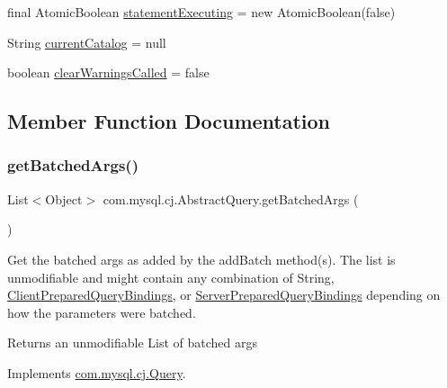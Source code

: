 \begin{DoxyCompactItemize}
\item 
final Atomic\+Boolean \mbox{\hyperlink{classcom_1_1mysql_1_1cj_1_1_abstract_query_a7bc25dcd0d74d8489a3e689fc2277379}{statement\+Executing}} = new Atomic\+Boolean(false)
\item 
String \mbox{\hyperlink{classcom_1_1mysql_1_1cj_1_1_abstract_query_a1b25ce6bc0b1b35dca039d246b51da60}{current\+Catalog}} = null
\item 
boolean \mbox{\hyperlink{classcom_1_1mysql_1_1cj_1_1_abstract_query_ad74a8ec76b857307a4271c7078454b8c}{clear\+Warnings\+Called}} = false
\end{DoxyCompactItemize}


\subsection{Member Function Documentation}
\mbox{\label{classcom_1_1mysql_1_1cj_1_1_abstract_query_aef6b23f8de5efa38c0334c9245c346bf}} 
\subsubsection{\texorpdfstring{get\+Batched\+Args()}{getBatchedArgs()}}
{\footnotesize\ttfamily List$<$Object$>$ com.\+mysql.\+cj.\+Abstract\+Query.\+get\+Batched\+Args (\begin{DoxyParamCaption}{ }\end{DoxyParamCaption})}

Get the batched args as added by the add\+Batch method(s). The list is unmodifiable and might contain any combination of String, \mbox{\hyperlink{classcom_1_1mysql_1_1cj_1_1_client_prepared_query_bindings}{Client\+Prepared\+Query\+Bindings}}, or \mbox{\hyperlink{classcom_1_1mysql_1_1cj_1_1_server_prepared_query_bindings}{Server\+Prepared\+Query\+Bindings}} depending on how the parameters were batched.

\begin{DoxyReturn}{Returns}
an unmodifiable List of batched args 
\end{DoxyReturn}


Implements \mbox{\hyperlink{interfacecom_1_1mysql_1_1cj_1_1_query_af927782ce04741b0b0d3447e9b4f2a08}{com.\+mysql.\+cj.\+Query}}.

